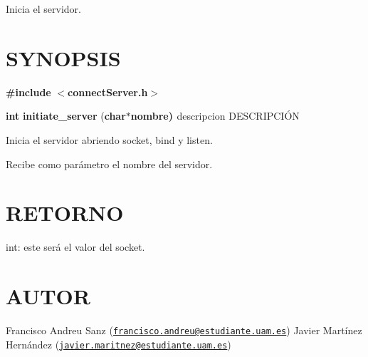 Inicia el servidor.\hypertarget{unknown_case_SYNOPSIS}{}\section{S\-Y\-N\-O\-P\-S\-I\-S}\label{unknown_case_SYNOPSIS}
{\bfseries \#include} {\bfseries $<$connect\-Server.\-h$>$} 

{\bfseries int} {\bfseries initiate\-\_\-server} {\bfseries }({\bfseries char{\bfseries $\ast${\bfseries nombre{\bfseries })}  } } descripcion D\-E\-S\-C\-R\-I\-P\-C\-IÓ\-N

Inicia el servidor abriendo socket, bind y listen.

Recibe como parámetro el nombre del servidor.\hypertarget{unknown_case_retorno}{}\section{R\-E\-T\-O\-R\-N\-O}\label{unknown_case_retorno}
int\-: este será el valor del socket.\hypertarget{unknown_case_authors}{}\section{A\-U\-T\-O\-R}\label{unknown_case_authors}
Francisco Andreu Sanz (\href{mailto:francisco.andreu@estudiante.uam.es}{\tt francisco.\-andreu@estudiante.\-uam.\-es}) Javier Martínez Hernández (\href{mailto:javier.maritnez@estudiante.uam.es}{\tt javier.\-maritnez@estudiante.\-uam.\-es}) 